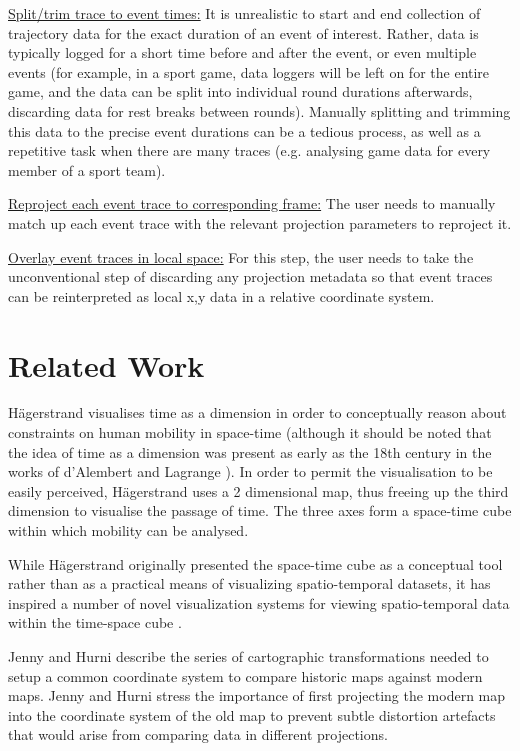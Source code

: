 \ul{Split/trim trace to event times:} It is unrealistic to start and end collection of trajectory data for the exact duration of an event of interest. Rather, data is typically logged for a short time before and after the event, or even multiple events (for example, in a sport game, data loggers will be left on for the entire game, and the data can be split into individual round durations afterwards, discarding data for rest breaks between rounds). Manually splitting and trimming this data to the precise event durations can be a tedious process, as well as a repetitive task when there are many traces (e.g. analysing game data for every member of a sport team).

\ul{Reproject each event trace to corresponding frame:} The user needs to manually match up each event trace with the relevant projection parameters to reproject it.

\ul{Overlay event traces in local space:} For this step, the user needs to take the unconventional step of discarding any projection metadata so that event traces can be reinterpreted as local x,y data in a relative coordinate system.


\section{Related Work}

Hägerstrand visualises time as a dimension in order to conceptually reason about constraints on human mobility in space-time \cite{hagerstrand_what_1970} (although it should be noted that the idea of time as a dimension was present as early as the 18th century in the works of d'Alembert and Lagrange \cite{archibald_time_1914, goenner_history_2008}). In order to permit the visualisation to be easily perceived, Hägerstrand uses a 2 dimensional map, thus freeing up the third dimension to visualise the passage of time. The three axes form a space-time cube within which mobility can be analysed.

While Hägerstrand originally presented the space-time cube as a conceptual tool rather than as a practical means of visualizing spatio-temporal datasets, it has inspired a number of novel visualization systems for viewing spatio-temporal data within the time-space cube \cite{kraak_m._space-time_2003, gatalsky_interactive_2004, andrienko_visualization_2014}.

Jenny and Hurni \cite{jenny_studying_2011} describe the series of cartographic transformations needed to setup a common coordinate system to compare historic maps against modern maps. Jenny and Hurni stress the importance of first projecting the modern map into the coordinate system of the old map to prevent subtle distortion artefacts that would arise from comparing data in different projections.

